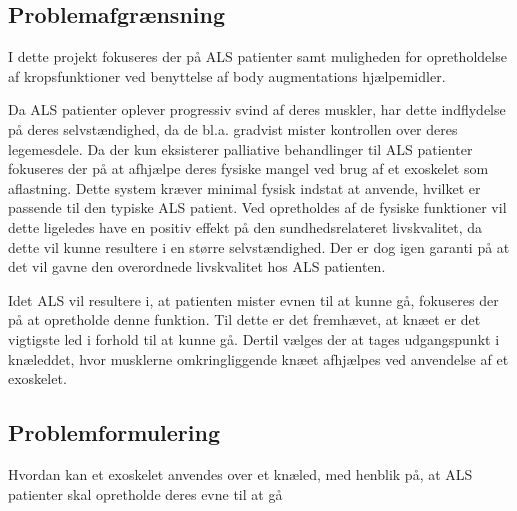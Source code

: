 \subsection{Problemafgrænsning}
I dette projekt fokuseres der på ALS patienter samt muligheden for opretholdelse af kropsfunktioner ved benyttelse af body augmentations hjælpemidler. 

Da ALS patienter oplever progressiv svind af deres muskler, har dette indflydelse på deres selvstændighed, da de bl.a. gradvist mister kontrollen over deres legemesdele. Da der kun eksisterer palliative behandlinger til ALS patienter fokuseres der på at afhjælpe deres fysiske mangel ved brug af et exoskelet som aflastning. Dette system kræver minimal fysisk indstat at anvende, hvilket er passende til den typiske ALS patient. 
Ved opretholdes af de fysiske funktioner vil dette ligeledes have en positiv effekt på den sundhedsrelateret livskvalitet, da dette vil kunne resultere i en større selvstændighed. Der er dog igen garanti på at det vil gavne den overordnede livskvalitet hos ALS patienten.  

Idet ALS vil resultere i, at patienten mister evnen til at kunne gå, fokuseres der på at opretholde denne funktion. Til dette er det fremhævet, at knæet er det vigtigste led i forhold til at kunne gå. Dertil vælges der at tages udgangspunkt i knæleddet, hvor musklerne omkringliggende knæet afhjælpes ved anvendelse af et exoskelet.

\subsection{Problemformulering}
Hvordan kan et exoskelet anvendes over et knæled, med henblik på, at ALS patienter skal opretholde deres evne til at gå 